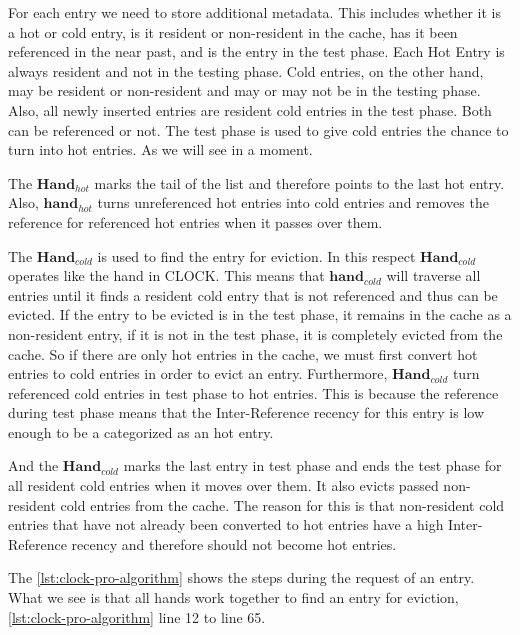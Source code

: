 \documentclass[
	12pt,
	a4paper,
	abstract,
	bibliography=totoc,
	chapterprefix,
	headings=openright,
	numbers=endperiod,
	parskip=half,
	twoside,
]{scrreprt}
\begin{document}
For each entry we need to store additional metadata. This includes whether it is a hot or cold entry, is it resident or non-resident in the cache, has it been referenced in the near past, and is the entry in the test phase.
Each Hot Entry is always resident and not in the testing phase.
Cold entries, on the other hand, may be resident or non-resident and may or may not be in the testing phase.
Also, all newly inserted entries are resident cold entries in the test phase.
Both can be referenced or not.
The test phase is used to give cold entries the chance to turn into hot entries.
As we will see in a moment.

The $\textbf{Hand}_{hot}$ marks the tail of the list and therefore points to the last hot entry.
Also, $\textbf{hand}_{hot}$ turns unreferenced hot entries into cold entries  and removes the reference for referenced hot entries when it passes over them.


The $\textbf{Hand}_{cold}$ is used to find the entry for eviction. 
In this respect $\textbf{Hand}_{cold}$ operates like the hand in CLOCK.
This means that $\textbf{hand}_{cold}$ will traverse all entries until it finds a resident cold entry that is not referenced and thus can be evicted.
If the entry to be evicted is in the test phase, it remains in the cache as a non-resident entry, if it is not in the test phase, it is completely evicted from the cache.
So if there are only hot entries in the cache,  
we must first convert hot entries to cold entries in order to evict an entry.
Furthermore, $\textbf{Hand}_{cold}$ turn referenced cold entries in test phase to hot entries. 
This is because the reference during test phase means that the Inter-Reference recency for this entry is low enough to be a categorized as an hot entry.

And the $\textbf{Hand}_{cold}$ marks the last entry in test phase and ends the test phase for all resident cold entries when it moves over them. 
It also evicts passed non-resident cold entries from the cache.
The reason for this is that non-resident cold entries that have not already been converted to hot entries have a high Inter-Reference recency 
and therefore should not become hot entries.

The \cref{lst:clock-pro-algorithm} shows the steps during the request of an entry.
What we see is that all hands work together to find an entry for eviction, \cref{lst:clock-pro-algorithm} line 12 to line 65.

\bigskip
\end{document}
